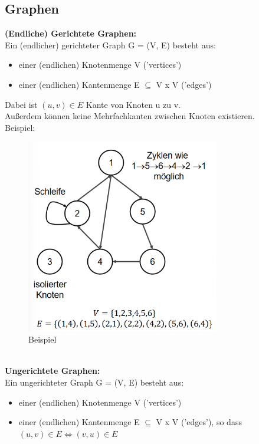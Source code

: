 \documentclass{article}
\begin{document}
        \subsection{Graphen}
            \textbf{(Endliche) Gerichtete Graphen:}\\
            Ein (endlicher) gerichteter Graph G = (V, E) besteht aus:
            \begin{itemize}
                \item einer (endlichen) Knotenmenge V ('vertices')
                \item einer (endlichen) Kantenmenge E $\subseteq$ V x V ('edges')
            \end{itemize}
            Dabei ist $(u,v)\in E$ Kante von Knoten u zu v.\\
            Außerdem können keine Mehrfachkanten zwischen Knoten existieren. \\
            Beispiel:
            \begin{figure}[ht]
                \centering
                \includegraphics[width=0.75\textwidth]{Bilder/GeGraphBSP.png}
                \caption{Beispiel}
                \label{fig:GeGraphBSP}
            \end{figure}\\
            \textbf{Ungerichtete Graphen:}\\
            Ein ungerichteter Graph G = (V, E) besteht aus:
            \begin{itemize}
                \item einer (endlichen) Knotenmenge V ('vertices')
                \item einer (endlichen) Kantenmenge E $\subseteq$ V x V ('edges'), so dass $(u,v)\in E \Leftrightarrow (v,u)\in E$
            \end{itemize}
\end{document}
